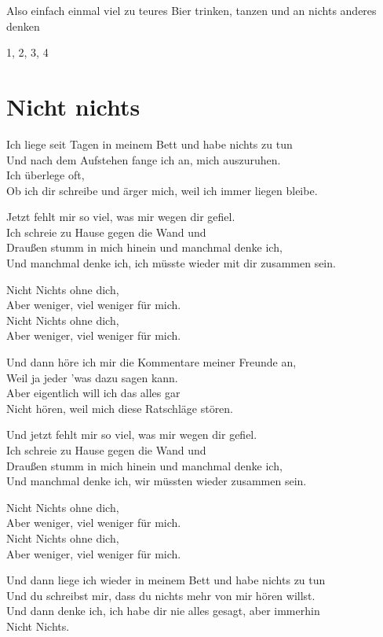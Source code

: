 \documentclass[]{book}
\begin{document}
Also einfach einmal viel zu teures Bier trinken, tanzen und an nichts anderes denken

1, 2, 3, 4

\hypertarget{nicht-nichts}{%
\section{Nicht nichts}\label{nicht-nichts}}

Ich liege seit Tagen in meinem Bett und habe nichts zu tun\\
Und nach dem Aufstehen fange ich an, mich auszuruhen.\\
Ich überlege oft,\\
Ob ich dir schreibe und ärger mich, weil ich immer liegen bleibe.

Jetzt fehlt mir so viel, was mir wegen dir gefiel.\\
Ich schreie zu Hause gegen die Wand und\\
Draußen stumm in mich hinein und manchmal denke ich,\\
Und manchmal denke ich, ich müsste wieder mit dir zusammen sein.

Nicht Nichts ohne dich,\\
Aber weniger, viel weniger für mich.\\
Nicht Nichts ohne dich,\\
Aber weniger, viel weniger für mich.

Und dann höre ich mir die Kommentare meiner Freunde an,\\
Weil ja jeder 'was dazu sagen kann.\\
Aber eigentlich will ich das alles gar\\
Nicht hören, weil mich diese Ratschläge stören.

Und jetzt fehlt mir so viel, was mir wegen dir gefiel.\\
Ich schreie zu Hause gegen die Wand und\\
Draußen stumm in mich hinein und manchmal denke ich,\\
Und manchmal denke ich, wir müssten wieder zusammen sein.

Nicht Nichts ohne dich,\\
Aber weniger, viel weniger für mich.\\
Nicht Nichts ohne dich,\\
Aber weniger, viel weniger für mich.

Und dann liege ich wieder in meinem Bett und habe nichts zu tun\\
Und du schreibst mir, dass du nichts mehr von mir hören willst.\\
Und dann denke ich, ich habe dir nie alles gesagt, aber immerhin\\
Nicht Nichts.
\end{document}
